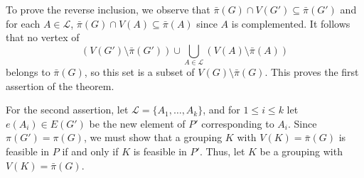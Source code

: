 To prove the reverse inclusion, we observe that $\bar{\pi}(G) \cap V(G') \subseteq \bar{\pi}(G')$ and for each $A \in \mathscr{L}$, $\bar{\pi}(G) \cap V(A) \subseteq \bar{\pi}(A)$ since $A$ is complemented. It follows that no vertex of
\begin{equation*}
(V(G') \setminus \bar{\pi}(G')) \cup \bigcup_{A \in \mathscr{L}} (V(A) \setminus \bar{\pi}(A))
\end{equation*}
belongs to $\bar{\pi}(G)$, so this set is a subset of $V(G) \setminus \bar{\pi}(G)$. This proves the first assertion of the theorem.

For the second assertion, let $\mathscr{L} = \{A_1, \dots, A_k\}$, and for $1 \le i \le k$ let $e(A_i) \in E(G')$ be the new element of $P'$ corresponding to $A_i$. Since $\pi(G') = \pi(G)$, we must show that a grouping $K$ with $V(K) = \bar{\pi}(G)$ is feasible in $P$ if and only if $K$ is feasible in $P'$. Thus, let $K$ be a grouping with $V(K) = \bar{\pi}(G)$.

